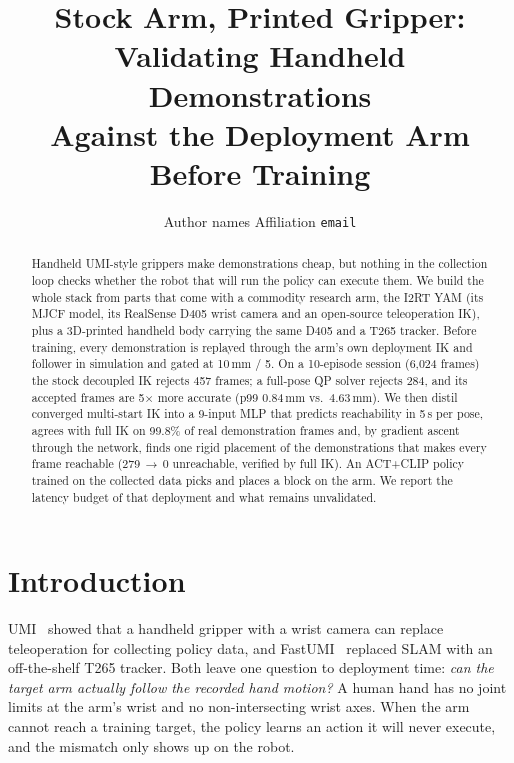\documentclass[10pt,twocolumn]{article}
\title{Stock Arm, Printed Gripper: Validating Handheld Demonstrations\\
Against the Deployment Arm Before Training}
\author{Author names \quad Affiliation \quad \texttt{email}}
\date{}
\begin{document}
\maketitle

\begin{abstract}
Handheld UMI-style grippers make demonstrations cheap, but nothing in the
collection loop checks whether the robot that will run the policy can execute
them. We build the whole stack from parts that come with a commodity research
arm, the I2RT YAM (its MJCF model, its RealSense D405 wrist camera and an
open-source teleoperation IK), plus a 3D-printed handheld body carrying the same
D405 and a T265 tracker. Before training, every demonstration is replayed
through the arm's own deployment IK and follower in simulation and gated at
10\,mm / 5\textdegree. On a 10-episode session (6{,}024 frames) the stock
decoupled IK rejects 457 frames; a full-pose QP solver rejects 284, and its
accepted frames are 5$\times$ more accurate (p99 0.84\,mm vs.\ 4.63\,mm). We then
distil converged multi-start IK into a 9-input MLP that predicts reachability in
5\,\textmu s per pose, agrees with full IK on 99.8\% of real demonstration frames
and, by gradient ascent through the network, finds one rigid placement of the
demonstrations that makes every frame reachable (279\,$\to$\,0 unreachable,
verified by full IK). An ACT+CLIP policy trained on the collected data
picks and places a block on the arm. We report the latency budget of that
deployment and what remains unvalidated.
\end{abstract}

\section{Introduction}
UMI~\citep{chi2024umi} showed that a handheld gripper with a wrist camera can
replace teleoperation for collecting policy data, and FastUMI~\citep{zhaxizhuoma2024fastumi}
replaced SLAM with an off-the-shelf T265 tracker. Both leave one question to
deployment time: \emph{can the target arm actually follow the recorded hand
motion?} A human hand has no joint limits at the arm's wrist and no
non-intersecting wrist axes. When the arm cannot reach a training target, the
policy learns an action it will never execute, and the mismatch only shows up
on the robot.
\end{document}
